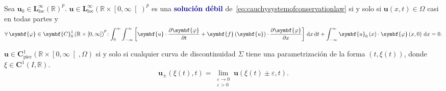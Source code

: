 \begin{definition}
	Sea
	\begin{math}
		\symbf{u}_{0}\in
		{\symbf{L}^{\infty}_{\text{loc}}\left(\mathbb{R}\right)}^{p}
	\end{math}.
	\begin{math}
		\symbf{u}\in
		{\symbf{L}^{\infty}_{\text{loc}}\left(\mathbb{R}\times\left[0,\infty\right[\right)}^{p}
	\end{math}
	es una \textcolor{DarkBlue}{\bfseries solución débil}
	de~\eqref{eq:cauchysystemofconservationlaw} si y solo si
	$\symbf{u}\left(x,t\right)\in\Omega$ casi en todas partes y
	\begin{equation*}
		\forall\symbf{\varphi}\in
		{\symbf{C}^{1}_{0}\left(\mathbb{R}\times\left[0,\infty\right[\right)}^{p}\!:
		\int_{0}^{\infty}
		\int_{\mathbb{-\infty}}^{\infty}
		\left[
			\symbf{u}\cdot
			\diffp{\symbf{\varphi}}{t}+
			\symbf{f}\left(\symbf{u}\right)\cdot
			\diffp{\symbf{\varphi}}{x}
			\right]
		\dl x
		\dl t+
		\int_{-\infty}^{\infty}
		\symbf{u}_{0}\left(x\right)\cdot
		\symbf{\varphi}\left(x,0\right)
		\dl x=
		0.
	\end{equation*}
\end{definition}


\begin{definition}
	\begin{math}
		\symbf{u}\in
		\symbf{C}^{1}_{\text{piec}}
		\left(\mathbb{R}\times\left[0,\infty\right[,\Omega\right)
	\end{math}
	si y solo si
	cualquier curva de discontinuidad $\Sigma$ tiene una
	parametrización de la forma $\left(t,\xi\left(t\right)\right)$,
	donde $\xi\in\symbf{C}^{1}\left(I,\mathbb{R}\right)$.
	\begin{equation*}
		\symbf{u}_{\pm}\left(\xi\left(t\right),t\right)=
		\lim_{\substack{\varepsilon\to0\\\varepsilon>0}}
		\symbf{u}\left(\xi\left(t\right)\pm\varepsilon,t\right).
	\end{equation*}
\end{definition}

